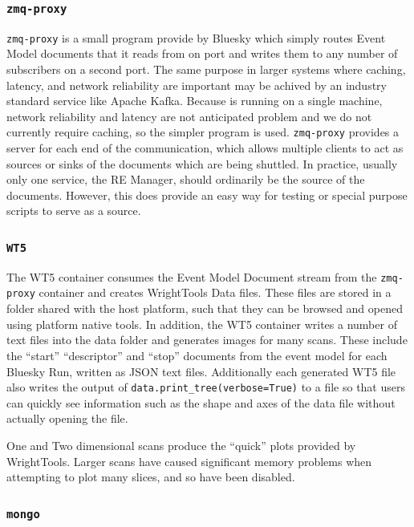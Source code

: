 \subsubsection{\texttt{zmq-proxy}}

\texttt{zmq-proxy} is a small program provide by Bluesky which simply routes Event Model documents that it reads from on port and writes them to any number of subscribers on a second port.
The same purpose in larger systems where caching, latency, and network reliability are important may be achived by an industry standard service like Apache Kafka\cite{}.
Because \biab is running on a single machine, network reliability and latency are not anticipated problem and we do not currently require caching, so the simpler program is used.
\texttt{zmq-proxy} provides a server for each end of the communication, which allows multiple clients to act as sources or sinks of the documents which are being shuttled.
In practice, usually only one service, the RE Manager, should ordinarily be the source of the documents.
However, this does provide an easy way for testing or special purpose scripts to serve as a source.

\subsubsection{\texttt{WT5}}

The WT5 container consumes the Event Model Document stream from the \texttt{zmq-proxy} container and creates WrightTools Data files.
These files are stored in a folder shared with the host platform, such that they can be browsed and opened using platform native tools.
In addition, the WT5 container writes a number of text files into the data folder and generates images for many scans.
These include the ``start'' ``descriptor'' and ``stop'' documents from the event model for each Bluesky Run, written as JSON text files.
Additionally each generated WT5 file also writes the output of \texttt{data.print\_tree(verbose=True)} to a file so that users can quickly see information such as the shape and axes of the data file without actually opening the file.

One and Two dimensional scans produce the ``quick'' plots provided by WrightTools.
Larger scans have caused significant memory problems when attempting to plot many slices, and so have been disabled.

\subsubsection{\texttt{mongo}}

